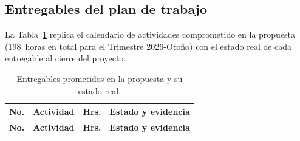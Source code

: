 \subsection{Entregables del plan de trabajo}\label{apx:entregables}
\justifying

La Tabla~\ref{tab:entregablesReales} replica el calendario de actividades comprometido en la propuesta (198~horas en total para el Trimestre 2026-Otoño) con el estado real de cada entregable al cierre del proyecto.

\begin{longtable}{p{} p{} p{} p{}}
    \caption{Entregables prometidos en la propuesta y su estado real.}
    \label{tab:entregablesReales}\\
    \toprule
    \textbf{No.} & \textbf{Actividad} & \textbf{Hrs.} & \textbf{Estado y evidencia} \\
    \midrule
    \endfirsthead

    \toprule
    \textbf{No.} & \textbf{Actividad} & \textbf{Hrs.} & \textbf{Estado y evidencia} \\
    \midrule
    \endhead


\end{longtable}
